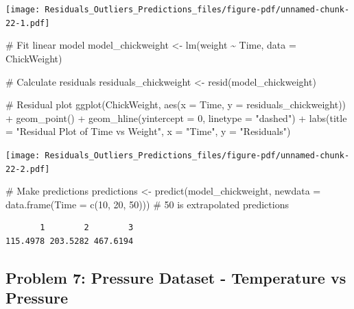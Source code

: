 \documentclass[
  letterpaper,
  DIV=11,
  numbers=noendperiod]{scrreprt}
\newenvironment{Shaded}{\begin{snugshade}}{\end{snugshade}}
\newcommand{\AttributeTok}[1]{\textcolor[rgb]{0.40,0.45,0.13}{#1}}
\newcommand{\CommentTok}[1]{\textcolor[rgb]{0.37,0.37,0.37}{#1}}
\newcommand{\DecValTok}[1]{\textcolor[rgb]{0.68,0.00,0.00}{#1}}
\newcommand{\FunctionTok}[1]{\textcolor[rgb]{0.28,0.35,0.67}{#1}}
\newcommand{\NormalTok}[1]{\textcolor[rgb]{0.00,0.23,0.31}{#1}}
\newcommand{\OtherTok}[1]{\textcolor[rgb]{0.00,0.23,0.31}{#1}}
\newcommand{\SpecialCharTok}[1]{\textcolor[rgb]{0.37,0.37,0.37}{#1}}
\newcommand{\StringTok}[1]{\textcolor[rgb]{0.13,0.47,0.30}{#1}}
\begin{document}
\texttt{[image: Residuals\_Outliers\_Predictions\_files/figure-pdf/unnamed-chunk-22-1.pdf]}

\begin{Shaded}
\begin{Highlighting}[]
\CommentTok{\# Fit linear model}
\NormalTok{model\_chickweight }\OtherTok{\textless{}{-}} \FunctionTok{lm}\NormalTok{(weight }\SpecialCharTok{\textasciitilde{}}\NormalTok{ Time, }\AttributeTok{data =}\NormalTok{ ChickWeight)}

\CommentTok{\# Calculate residuals}
\NormalTok{residuals\_chickweight }\OtherTok{\textless{}{-}} \FunctionTok{resid}\NormalTok{(model\_chickweight)}

\CommentTok{\# Residual plot}
\FunctionTok{ggplot}\NormalTok{(ChickWeight, }\FunctionTok{aes}\NormalTok{(}\AttributeTok{x =}\NormalTok{ Time, }\AttributeTok{y =}\NormalTok{ residuals\_chickweight)) }\SpecialCharTok{+}
  \FunctionTok{geom\_point}\NormalTok{() }\SpecialCharTok{+}
  \FunctionTok{geom\_hline}\NormalTok{(}\AttributeTok{yintercept =} \DecValTok{0}\NormalTok{, }\AttributeTok{linetype =} \StringTok{"dashed"}\NormalTok{) }\SpecialCharTok{+}
  \FunctionTok{labs}\NormalTok{(}\AttributeTok{title =} \StringTok{"Residual Plot of Time vs Weight"}\NormalTok{, }\AttributeTok{x =} \StringTok{"Time"}\NormalTok{, }\AttributeTok{y =} \StringTok{"Residuals"}\NormalTok{)}
\end{Highlighting}
\end{Shaded}

\texttt{[image: Residuals\_Outliers\_Predictions\_files/figure-pdf/unnamed-chunk-22-2.pdf]}

\begin{Shaded}
\begin{Highlighting}[]
\CommentTok{\# Make predictions}
\NormalTok{predictions }\OtherTok{\textless{}{-}} \FunctionTok{predict}\NormalTok{(model\_chickweight, }\AttributeTok{newdata =} \FunctionTok{data.frame}\NormalTok{(}\AttributeTok{Time =} \FunctionTok{c}\NormalTok{(}\DecValTok{10}\NormalTok{, }\DecValTok{20}\NormalTok{, }\DecValTok{50}\NormalTok{))) }\CommentTok{\# 50 is extrapolated}
\NormalTok{predictions}
\end{Highlighting}
\end{Shaded}

\begin{verbatim}
       1        2        3 
115.4978 203.5282 467.6194 
\end{verbatim}

\subsection*{Problem 7: Pressure Dataset - Temperature vs
Pressure}\label{problem-7-pressure-dataset---temperature-vs-pressure-2}
\end{document}
